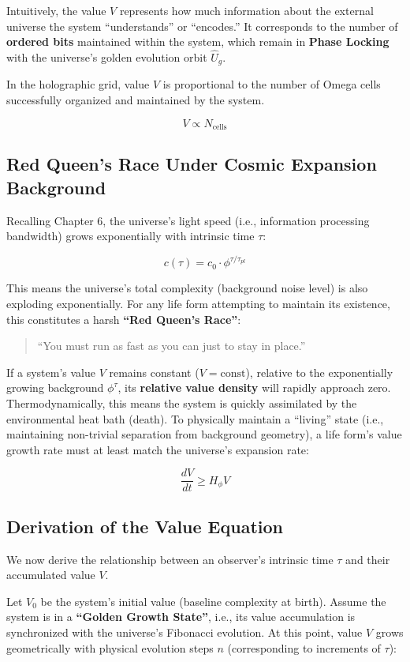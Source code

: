 Intuitively, the value $V$ represents how much information about the external universe the system ``understands'' or ``encodes.'' It corresponds to the number of \textbf{ordered bits} maintained within the system, which remain in \textbf{Phase Locking} with the universe's golden evolution orbit $\hat{U}_g$.

In the holographic grid, value $V$ is proportional to the number of Omega cells successfully organized and maintained by the system.

\[V \propto N_{\text{cells}}\]

\subsection{Red Queen's Race Under Cosmic Expansion Background}

Recalling Chapter 6, the universe's light speed (i.e., information processing bandwidth) grows exponentially with intrinsic time $\tau$:

\[c(\tau) = c_0 \cdot \phi^{\tau/\tau_{pl}}\]

This means the universe's total complexity (background noise level) is also exploding exponentially.
For any life form attempting to maintain its existence, this constitutes a harsh \textbf{``Red Queen's Race''}:

\begin{quote}
``You must run as fast as you can just to stay in place.''
\end{quote}

If a system's value $V$ remains constant ($V = \text{const}$), relative to the exponentially growing background $\phi^\tau$, its \textbf{relative value density} will rapidly approach zero. Thermodynamically, this means the system is quickly assimilated by the environmental heat bath (death).
To physically maintain a ``living'' state (i.e., maintaining non-trivial separation from background geometry), a life form's value growth rate must at least match the universe's expansion rate:

\[\frac{d V}{d t} \ge H_\phi V\]

\subsection{Derivation of the Value Equation}

We now derive the relationship between an observer's intrinsic time $\tau$ and their accumulated value $V$.

Let $V_0$ be the system's initial value (baseline complexity at birth).
Assume the system is in a \textbf{``Golden Growth State''}, i.e., its value accumulation is synchronized with the universe's Fibonacci evolution. At this point, value $V$ grows geometrically with physical evolution steps $n$ (corresponding to increments of $\tau$):

